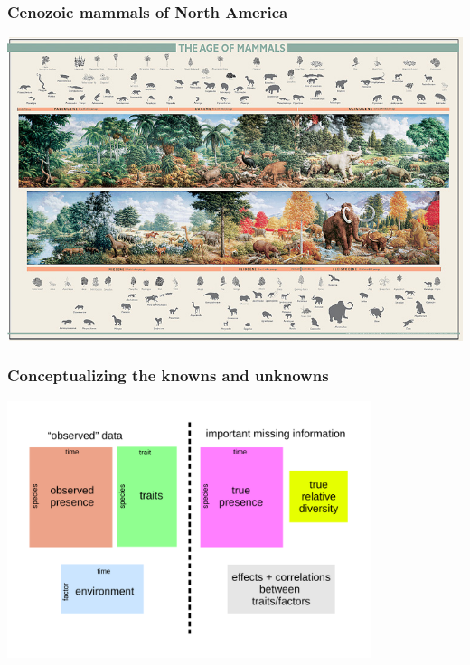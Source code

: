 \documentclass[aspectratio=169]{beamer}
\begin{document}
\begin{frame}
  \frametitle{Cenozoic mammals of North America}
  \begin{center}
    \includegraphics[height=0.775\textheight,width=\textwidth,keepaspectratio=true]{figure/aom}
  \end{center}

  \tiny{}
\end{frame}

\begin{frame}
  \frametitle{Conceptualizing the knowns and unknowns}
  \begin{center}
    \includegraphics[width=0.8\textwidth,height=\textheight,keepaspectratio=true]{figure/problem_concept}
  \end{center}
\end{frame}
\end{document}
